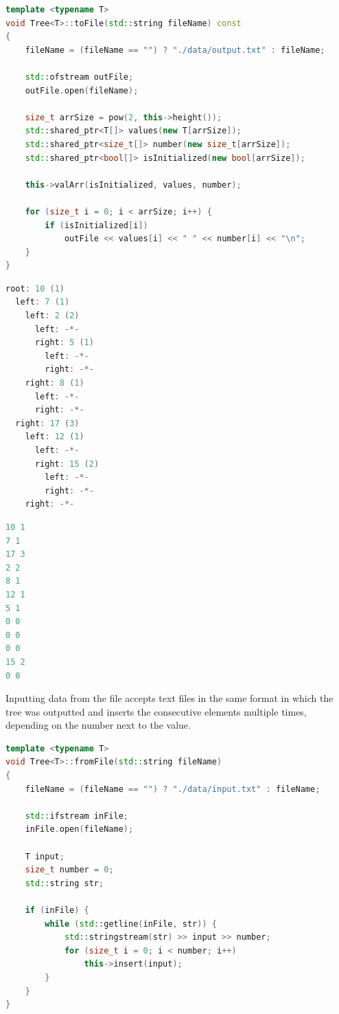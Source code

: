 \documentclass[12pt]{article}
\begin{document}
\begin{footnotesize}
\begin{lstlisting}[language=C++]
template <typename T>
void Tree<T>::toFile(std::string fileName) const
{
    fileName = (fileName == "") ? "./data/output.txt" : fileName;

    std::ofstream outFile;
    outFile.open(fileName);

    size_t arrSize = pow(2, this->height());
    std::shared_ptr<T[]> values(new T[arrSize]);
    std::shared_ptr<size_t[]> number(new size_t[arrSize]);
    std::shared_ptr<bool[]> isInitialized(new bool[arrSize]);

    this->valArr(isInitialized, values, number);

    for (size_t i = 0; i < arrSize; i++) {
        if (isInitialized[i])
            outFile << values[i] << " " << number[i] << "\n";
    }
}
\end{lstlisting}
\end{footnotesize}

\begin{footnotesize}
\begin{lstlisting}[language=C++, caption=Tree shown during program runtime]
root: 10 (1)
  left: 7 (1)
    left: 2 (2)
      left: -*-
      right: 5 (1)
        left: -*-
        right: -*-
    right: 8 (1)
      left: -*-
      right: -*-
  right: 17 (3)
    left: 12 (1)
      left: -*-
      right: 15 (2)
        left: -*-
        right: -*-
    right: -*-
\end{lstlisting}
\end{footnotesize}
\pagebreak
\begin{footnotesize}
\begin{lstlisting}[language=C++, caption=Serialized tree]
10 1
7 1
17 3
2 2
8 1
12 1
5 1
0 0
0 0
0 0
15 2
0 0
\end{lstlisting}
\end{footnotesize}

Inputting data from the file accepts text files in the same format in which the tree was outputted and inserts the consecutive elements multiple times, depending on the number next to the value. 

\begin{footnotesize}
\begin{lstlisting}[language=C++]
template <typename T>
void Tree<T>::fromFile(std::string fileName)
{
    fileName = (fileName == "") ? "./data/input.txt" : fileName;

    std::ifstream inFile;
    inFile.open(fileName);

    T input;
    size_t number = 0;
    std::string str;

    if (inFile) {
        while (std::getline(inFile, str)) {
            std::stringstream(str) >> input >> number;
            for (size_t i = 0; i < number; i++)
                this->insert(input);
        }
    }
}
\end{lstlisting}
\end{footnotesize}
\end{document}
